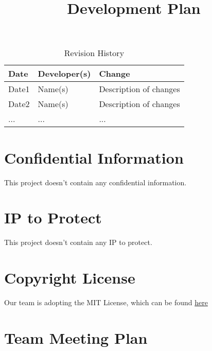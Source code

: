 \documentclass{article}
\title{Development Plan\\\progname}
\author{\authname}
\date{}
\begin{document}
\maketitle

\begin{table}[hp]
\caption{Revision History} \label{TblRevisionHistory}
\begin{tabularx}{\textwidth}{llX}
\toprule
\textbf{Date} & \textbf{Developer(s)} & \textbf{Change}\\
\midrule
Date1 & Name(s) & Description of changes\\
Date2 & Name(s) & Description of changes\\
... & ... & ...\\
\bottomrule
\end{tabularx}
\end{table}

\newpage{}



\section{Confidential Information}

This project doesn't contain any confidential information.


\section{IP to Protect}
This project doesn't contain any IP to protect. 
\section{Copyright License}

Our team is adopting the MIT License, which can be found \href{https://github.com/4G06-CAPSTONE-2025/Reading4All/blob/main/LICENSE} {here}

\section{Team Meeting Plan}
\end{document}
